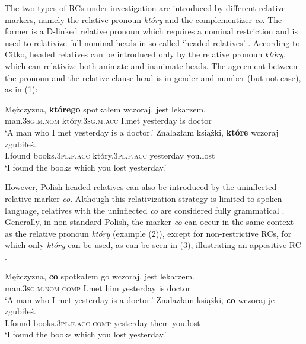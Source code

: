 \documentclass[output=paper]{langsci/langscibook}
\begin{document}
The two types of RCs under investigation are introduced by different relative markers, namely the relative pronoun \textit{który} and the complementizer \textit{co}. The former is a D-linked relative pronoun which requires a nominal restriction and is used to relativize full nominal heads in so-called ‘headed relatives’ \citep{Citko2004}. According to Citko, headed relatives can be introduced only by the relative pronoun \textit{który}, which can relativize both animate and inanimate heads. The agreement between the pronoun and the relative clause head is in gender and number (but not case), as in (1): 

\ea%
    \label{ex:leska:1}
    \ea
    \gll Mężczyzna, \textbf{którego} spotkałem wczoraj, jest lekarzem.\\
         man.\textsc{3sg.m.nom} który.\textsc{3sg.m.acc} I.met yesterday is doctor\\
    \glt ‘A man who I met yesterday is a doctor.’
\ex
    \gll Znalazłam   książki, \textbf{które}   wczoraj zgubiłeś. \\
         I.found books.\textsc{3pl.f.acc} który.\textsc{3pl.f.acc} yesterday you.lost\\
    \glt ‘I found the books which you lost yesterday.’
    \z
\z    

However, Polish headed relatives can also be introduced by the uninflected relative marker \textit{co}. Although this relativization strategy is limited to spoken language, relatives with the uninflected \textit{co} are considered fully grammatical \citep{Buttler1971}. Generally, in non-standard Polish, the marker \textit{co} can occur in the same context as the relative pronoun \textit{który} (example (2)), except for non-restrictive RCs, for which only \textit{który} can be used, as can be seen in (3), illustrating an appositive RC \citep{Borsley1981,Borsley1984}.

\ea%
    \label{ex:leska:2}
    \ea
    \gll Mężczyzna, \textbf{co} spotkałem go wczoraj, jest lekarzem.\\
         man.\textsc{3sg.m.nom} \textsc{comp} I.met him yesterday is doctor\\
    \glt ‘A man who I met yesterday is a doctor.’
    \ex
    \gll Znalazłam   książki, \textbf{co} wczoraj   je zgubiłeś. \\
         I.found books.\textsc{3pl.f.acc} \textsc{comp}\textsubscript{} yesterday them you.lost\\
    \glt ‘I found the books which you lost yesterday.’
    \z
\z    
\end{document}
